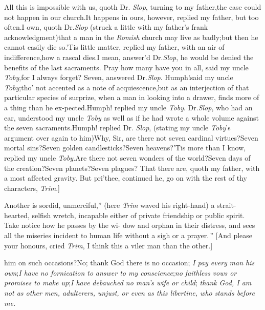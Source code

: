 \documentclass{article}
\begin{document}
All this is impossible with us, quoth Dr.\@
\textit{Slop}, turning to my father,\tsk the case could
not happen in our church.\tsh It\break
happens in ours,
however, replied my father, but too often.\tsh I own,
quoth Dr.\@ \textit{Slop} (struck a little with my
father’s frank acknowledgment)\tsk that a man in the
\textit{Romish} church may live as badly;\tsk\break but
then he cannot easily die so.\tsh ’Tis little matter,
replied my father, with an air of indifference,\tsk how
a rascal dies.\tsk\break I mean, answer’d Dr.\@ \textit{Slop},
he would be denied the benefits of the last
sacraments.\break
\tsk Pray how many have you in all, said my uncle
\textit{Toby},\tsk for I always forget?\tsk\break
Seven, answered Dr.\@ \textit{Slop}.\tsk
Humph!\tsk\break said my
uncle \textit{Toby};\tsk tho’ not accented as a note of
acquiescence,\tsk but as an interjection of that
particular species of surprize, when a man in looking
into a drawer, finds more of a thing than he
ex-\break pected.\tsk Humph! replied my uncle \textit{Toby}.
Dr.\@ \textit{Slop}, who had an ear, understood my uncle
\textit{Toby} as well as if he had wrote a whole volume
against the seven sacraments.\tsh Humph! replied Dr.\@
\textit{Slop}, (stating my uncle \textit{Toby}’s
argument over again to him)\tsh Why, Sir, are there not
seven cardinal virtues?\tsh Seven mortal sins?\tsh Seven
golden candlesticks?\tsh Seven heavens?\tsh ’Tis\break
more than I know, replied my uncle\break
\textit{Toby}.\tsh Are
there not seven wonders of the world?\tsh Seven days of
the creation?\tsh Seven planets?\tsh Seven plagues?\tsh
That there are, quoth my father, with a most affected
gravity. But pri’thee, continued he, go on with the rest
of thy characters, \textit{Trim}.]

\lqq Another is sordid, unmerciful,” (here\break
\textit{Trim} waved his right-hand) \lqq a strait-\break
\lqq hearted, selfish wretch, incapable either\break
\lqq of private friendship or public spirit.\break
\lqq Take notice how he passes by the wi-\break
\lqq dow and orphan in their distress, and\break
\lqq sees all the miseries incident to human\break
\lqq life without a sigh or a prayer.\,” [And
please your honours, cried
\textit{Trim}, I think this a viler man than the other.]

\lqq {}\break
\lqq him on such occasions?\tsh No; thank\break
\lqq God there is no occasion; \textit{I pay every}\break
\lqq \textit{man his own};\textit{\tsk I have no fornication to}\break
\lqq \textit{answer to my conscience};\textit{\tsk no faithless}\break
\lqq \textit{vows or promises to make up};\textit{\tsk I have}\break
\lqq \textit{debauched no man’s wife or child}; \textit{thank}\break
\lqq \textit{God, I am not as other men, adulterers,}\break
\lqq \textit{unjust, or even as this libertine, who}\break
\lqq \textit{stands before me.}
\end{document}
